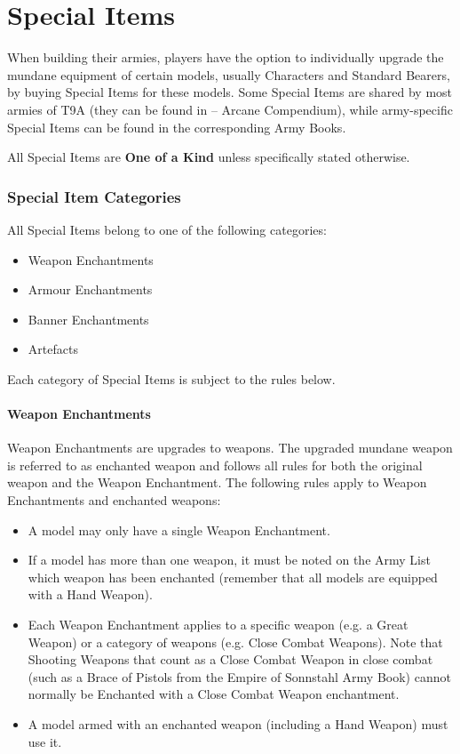 \part{Special Items}
\label{special_items}

When building their armies, players have the option to individually upgrade the mundane equipment of certain models, usually Characters and Standard Bearers, by buying Special Items for these models. Some Special Items are shared by most armies of T9A (they can be found in \nameofthegame{} -- Arcane Compendium), while army-specific Special Items can be found in the corresponding Army Books.

All Special Items are \textbf{One of a Kind} unless specifically stated otherwise.

\section{Special Item Categories}

All Special Items belong to one of the following categories:

\begin{itemize}
\item Weapon Enchantments
\item Armour Enchantments
\item Banner Enchantments
\item Artefacts
\end{itemize}

Each category of Special Items is subject to the rules below.

\subsection{Weapon Enchantments}
\label{weapon_enchantments}

Weapon Enchantments are upgrades to weapons. The upgraded mundane weapon is referred to as enchanted weapon and follows all rules for both the original weapon and the Weapon Enchantment. The following rules apply to Weapon Enchantments and enchanted weapons:
\begin{itemize}
\item A model may only have a single Weapon Enchantment.
\item If a model has more than one weapon, it must be noted on the Army List which weapon has been enchanted (remember that all models are equipped with a Hand Weapon).
\item Each Weapon Enchantment applies to a specific weapon (e.g. a Great Weapon) or a category of weapons (e.g. Close Combat Weapons). Note that Shooting Weapons that count as a Close Combat Weapon in close combat (such as a Brace of Pistols from the Empire of Sonnstahl Army Book) cannot normally be Enchanted with a Close Combat Weapon enchantment.
\item A model armed with an enchanted weapon (including a Hand Weapon) must use it.
\end{itemize}

